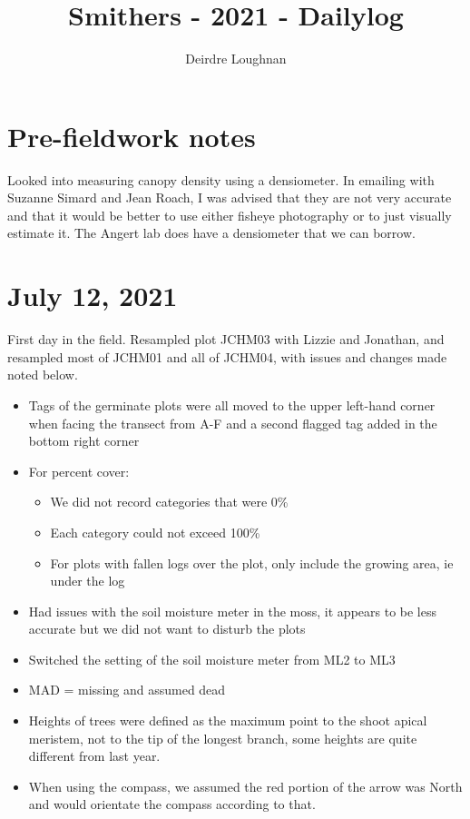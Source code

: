\documentclass{article}\usepackage[]{graphicx}\usepackage[]{color}
\title{Smithers - 2021 - Dailylog}
\author{Deirdre Loughnan}
\begin{document}
\maketitle
\section{Pre-fieldwork notes}

Looked into measuring canopy density using a densiometer. In emailing with Suzanne Simard and Jean Roach, I was advised that they are not very accurate and that it would be better to use either fisheye photography or to just visually estimate it. The Angert lab does have a densiometer that we can borrow.  

\section{July 12, 2021}

First day in the field. Resampled plot JCHM03 with Lizzie and Jonathan, and resampled most of JCHM01 and all of JCHM04, with issues and changes made noted below. 
\begin{itemize}
\item Tags of the germinate plots were all moved to the upper left-hand corner when facing the transect from A-F and a second flagged tag added in the bottom right corner
\item For percent cover:
\begin{itemize}
\item We did not record categories that were 0\%
\item Each category could not exceed 100\%
\item For plots with fallen logs over the plot, only include the growing area, ie under the log
\end {itemize}
\item Had issues with the soil moisture meter in the moss, it appears to be less accurate but we did not want to disturb the plots
\item Switched the setting of the soil moisture meter from ML2 to ML3
\item MAD = missing and assumed dead
\item Heights of trees were defined as the maximum point to the shoot apical meristem, not to the tip of the longest branch, some heights are quite different from last year.
\item When using the compass, we assumed the red portion of the arrow was North and would orientate the compass according to that. 
\end {itemize}
\end{document}
